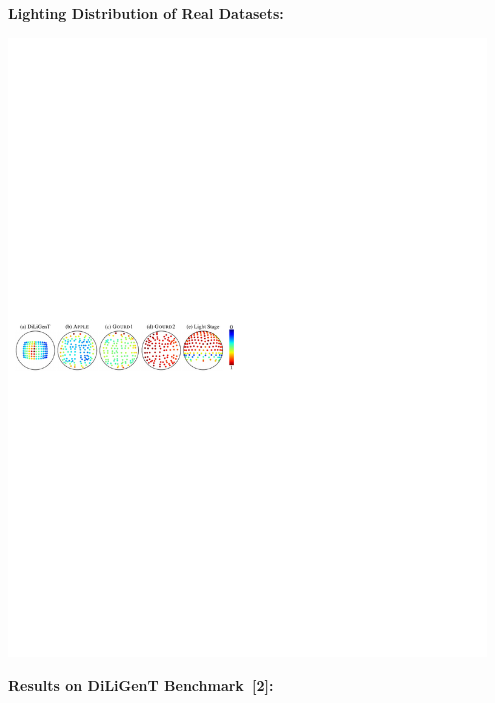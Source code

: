 \documentclass[landscape,a0paper,fontscale=0.292]{baposter}
\begin{document}
\begin{poster}
{\begin{minipage}[t]{0.50\textwidth}
        \vspace{0.1em}
        \textbf{\color{blue}Lighting Distribution of Real Datasets:} 
        \vspace{-0.2em}
        \begin{center}
            \includegraphics[width=0.95\textwidth]{images/real_lighting_dist.pdf}
        \end{center}
    \end{minipage}\hfill
    \begin{minipage}[t]{0.47\textwidth}
        \textbf{\color{blue}Results on DiLiGenT Benchmark~[2]:} 
        \vspace{-0.2em}
        \begin{center}

\end{center}
\end{minipage}}
\end{poster}
\end{document}
